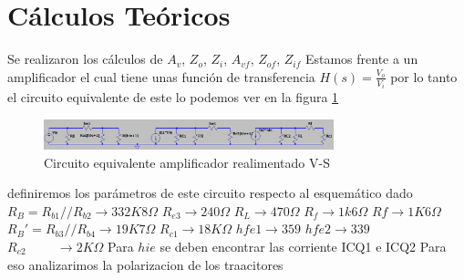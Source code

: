 \documentclass[12pt, letterpaper]{article}
\begin{document}
\section{Cálculos Teóricos}
Se realizaron los cálculos de $A_v$, $Z_o$, $Z_i$, $A_{vf}$, $Z_{of}$, $Z_{if}$
\singlespacing
Estamos frente a un amplificador el cual tiene unas función de transferencia $H(s)=\frac{V_o}{V_i}
$ por lo tanto el circuito equivalente de este lo podemos ver en la figura \ref{fig:2.1}
\begin{figure}[h]
	\centering
	\includegraphics[width=0.75\textwidth]{Imagenes/circeq.png}
	\caption{Circuito equivalente amplificador realimentado V-S}
	\label{fig:2.1}
\end{figure}
\singlespacing
definiremos los parámetros de este circuito respecto al esquemático dado
\singlespacing
$R_B=R_{b1}//R_{b2} \rightarrow 332K8\Omega$\hspace{1cm} 
\singlespacing
$R_{e3} \rightarrow 240\Omega$\hspace{1cm} $R_{L} \rightarrow 470\Omega$ \hspace{1cm} $R_{f} \rightarrow 1k6\Omega$
\singlespacing
$Rf \rightarrow 1K6\Omega$ \hspace{1cm} $R_B'=R_{b3}//R_{b4} \rightarrow 19K7\Omega$ \hspace{1cm} $R_{c1} \rightarrow18K\Omega$
\singlespacing
$hfe1 \rightarrow 359$ \hspace{1cm} $hfe2 \rightarrow 339$ $R_{c2} \hspace{1cm} \rightarrow 2K\Omega$
\singlespacing
Para $hie$ se deben encontrar las corriente ICQ1 e ICQ2 Para eso analizarimos la polarizacion de los traacitores
\\
\end{document}
